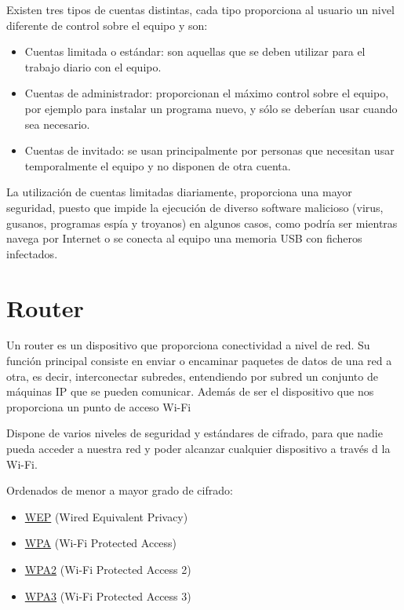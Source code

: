 \documentclass[
  spanish,
  a4paper,
  openany]{book}
\providecommand{\tightlist}{%
  \setlength{\itemsep}{0pt}\setlength{\parskip}{0pt}}
\begin{document}
Existen tres tipos de cuentas distintas, cada tipo proporciona al usuario un nivel diferente de control sobre el equipo y son:

\begin{itemize}
\item
  Cuentas limitada o estándar: son aquellas que se deben utilizar para el trabajo diario con el equipo.
\item
  Cuentas de administrador: proporcionan el máximo control sobre el equipo, por ejemplo para instalar un programa nuevo, y sólo se deberían usar cuando sea necesario.
\item
  Cuentas de invitado: se usan principalmente por personas que necesitan usar temporalmente el equipo y no disponen de otra cuenta.
\end{itemize}

La utilización de cuentas limitadas diariamente, proporciona una mayor seguridad, puesto que impide la ejecución de diverso software malicioso (virus, gusanos, programas espía y troyanos) en algunos casos, como podría ser mientras navega por Internet o se conecta al equipo una memoria USB con ficheros infectados.

\hypertarget{router}{%
\section{Router}\label{router}}

Un router es un dispositivo que proporciona conectividad a nivel de red. Su función principal consiste en enviar o encaminar paquetes de datos de una red a otra, es decir, interconectar subredes, entendiendo por subred un conjunto de máquinas IP que se pueden comunicar. Además de ser el dispositivo que nos proporciona un punto de acceso Wi-Fi

Dispone de varios niveles de seguridad y estándares de cifrado, para que nadie pueda acceder a nuestra red y poder alcanzar cualquier dispositivo a través d la Wi-Fi.

Ordenados de menor a mayor grado de cifrado:

\begin{itemize}
\tightlist
\item
  \href{https://es.wikipedia.org/wiki/Wired_Equivalent_Privacy}{WEP} (Wired Equivalent Privacy)
\item
  \href{https://es.wikipedia.org/wiki/Wi-Fi_Protected_Access}{WPA} (Wi-Fi Protected Access)
\item
  \href{https://es.wikipedia.org/wiki/WPA2}{WPA2} (Wi-Fi Protected Access 2)
\item
  \href{https://es.wikipedia.org/wiki/WPA3}{WPA3} (Wi-Fi Protected Access 3)
\end{itemize}
\end{document}

